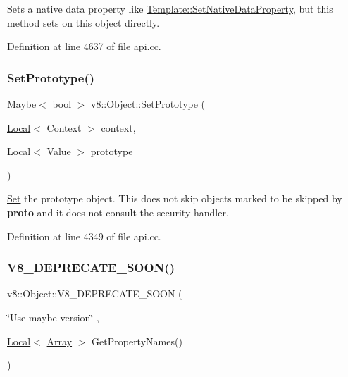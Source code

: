 Sets a native data property like \mbox{\hyperlink{classv8_1_1Template_a771f6ca09e5c4789306f8638de5b99ed}{Template\+::\+Set\+Native\+Data\+Property}}, but this method sets on this object directly. 

Definition at line 4637 of file api.\+cc.

\mbox{\label{classv8_1_1Object_a2c46cb0021b8cf761e83bf562badf572}} 
\subsubsection{\texorpdfstring{Set\+Prototype()}{SetPrototype()}}
{\footnotesize\ttfamily \mbox{\hyperlink{classv8_1_1Maybe}{Maybe}}$<$ \mbox{\hyperlink{classbool}{bool}} $>$ v8\+::\+Object\+::\+Set\+Prototype (\begin{DoxyParamCaption}\item[{\mbox{\hyperlink{classv8_1_1Local}{Local}}$<$ Context $>$}]{context,  }\item[{\mbox{\hyperlink{classv8_1_1Local}{Local}}$<$ \mbox{\hyperlink{classv8_1_1Value}{Value}} $>$}]{prototype }\end{DoxyParamCaption})}

\mbox{\hyperlink{classv8_1_1Set}{Set}} the prototype object. This does not skip objects marked to be skipped by {\bfseries proto} and it does not consult the security handler. 

Definition at line 4349 of file api.\+cc.

\mbox{\label{classv8_1_1Object_a3f735ad2eab826ddc5eba467ce624acb}} 
\subsubsection{\texorpdfstring{V8\+\_\+\+D\+E\+P\+R\+E\+C\+A\+T\+E\+\_\+\+S\+O\+O\+N()}{V8\_DEPRECATE\_SOON()}\hspace{0.1cm}{\footnotesize\ttfamily [1/2]}}
{\footnotesize\ttfamily v8\+::\+Object\+::\+V8\+\_\+\+D\+E\+P\+R\+E\+C\+A\+T\+E\+\_\+\+S\+O\+ON (\begin{DoxyParamCaption}\item[{\char`\"{}Use maybe version\char`\"{}}]{,  }\item[{\mbox{\hyperlink{classv8_1_1Local}{Local}}$<$ \mbox{\hyperlink{classv8_1_1Array}{Array}} $>$ }]{Get\+Property\+Names() }\end{DoxyParamCaption})}

